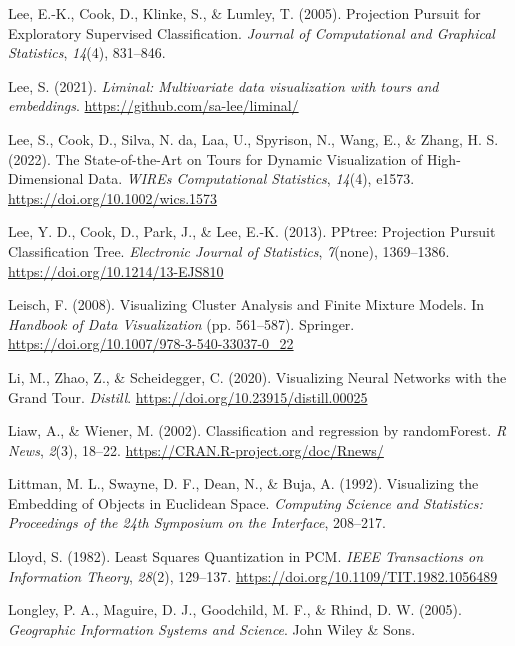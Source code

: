\documentclass[
  letterpaper,
]{krantz}
\newlength{\cslhangindent}
\newenvironment{CSLReferences}[2] %
 {\begin{list}{}{%
  \setlength{\itemindent}{0pt}
  \setlength{\leftmargin}{0pt}
  \setlength{\parsep}{0pt}
  \ifodd #1
   \setlength{\leftmargin}{\cslhangindent}
   \setlength{\itemindent}{-1\cslhangindent}
  \fi
  \setlength{\itemsep}{#2\baselineskip}}}
 {\end{list}}
\begin{document}
\begin{CSLReferences}{1}{0}
Lee, E.-K., Cook, D., Klinke, S., \& Lumley, T. (2005). {P}rojection
{P}ursuit for {E}xploratory {S}upervised {C}lassification. \emph{Journal
of Computational and Graphical Statistics}, \emph{14}(4), 831--846.

Lee, S. (2021). \emph{Liminal: Multivariate data visualization with
tours and embeddings}. \url{https://github.com/sa-lee/liminal/}

Lee, S., Cook, D., Silva, N. da, Laa, U., Spyrison, N., Wang, E., \&
Zhang, H. S. (2022). The {S}tate-of-the-{A}rt on {T}ours for {D}ynamic
{V}isualization of {H}igh-{D}imensional {D}ata. \emph{WIREs
Computational Statistics}, \emph{14}(4), e1573.
\url{https://doi.org/10.1002/wics.1573}

Lee, Y. D., Cook, D., Park, J., \& Lee, E.-K. (2013). {PPtree:
{P}rojection {P}ursuit {C}lassification {T}ree}. \emph{Electronic
Journal of Statistics}, \emph{7}(none), 1369--1386.
\url{https://doi.org/10.1214/13-EJS810}

Leisch, F. (2008). Visualizing {C}luster {A}nalysis and {F}inite
{M}ixture {M}odels. In \emph{Handbook of {D}ata {V}isualization} (pp.
561--587). Springer. \url{https://doi.org/10.1007/978-3-540-33037-0_22}

Li, M., Zhao, Z., \& Scheidegger, C. (2020). Visualizing {N}eural
{N}etworks with the {G}rand {T}our. \emph{Distill}.
\url{https://doi.org/10.23915/distill.00025}

Liaw, A., \& Wiener, M. (2002). Classification and regression by
randomForest. \emph{R News}, \emph{2}(3), 18--22.
\url{https://CRAN.R-project.org/doc/Rnews/}

Littman, M. L., Swayne, D. F., Dean, N., \& Buja, A. (1992). Visualizing
the {E}mbedding of {O}bjects in {E}uclidean {S}pace. \emph{Computing
Science and Statistics: Proceedings of the 24th Symposium on the
Interface}, 208--217.

Lloyd, S. (1982). Least {S}quares {Q}uantization in PCM. \emph{IEEE
Transactions on Information Theory}, \emph{28}(2), 129--137.
\url{https://doi.org/10.1109/TIT.1982.1056489}

Longley, P. A., Maguire, D. J., Goodchild, M. F., \& Rhind, D. W.
(2005). \emph{Geographic {I}nformation {S}ystems and {S}cience}. John
Wiley \& Sons.


\end{CSLReferences}
\end{document}
